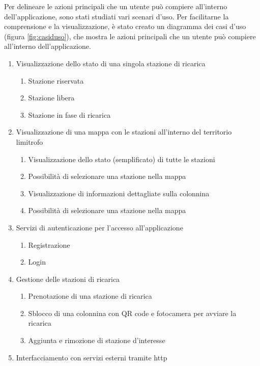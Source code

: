 Per delineare le azioni principali che un utente può compiere all'interno dell'applicazione, sono stati studiati vari scenari d'uso.
Per facilitarne la comprensione e la visualizzazione, è stato creato un diagramma dei casi d'uso (figura \ref{fig:casiduso}), che mostra le azioni principali che un utente può compiere all'interno dell'applicazione.
\begin{enumerate}[label=\arabic*.]
    \item Visualizzazione dello stato di una singola stazione di ricarica
          \begin{enumerate}[label=\arabic{enumi}.\arabic*]
              \item Stazione riservata
              \item Stazione libera
              \item Stazione in fase di ricarica
          \end{enumerate}
    \item Visualizzazione di una mappa con le stazioni all'interno del territorio limitrofo
          \begin{enumerate}[label=\arabic{enumi}.\arabic*]
              \item Visualizzazione dello stato (semplificato) di tutte le stazioni
              \item Possibilità di selezionare una stazione nella mappa
              \item Visualizzazione di informazioni dettagliate sulla colonnina
              \item Possibilità di selezionare una stazione nella mappa
          \end{enumerate}
    \item Servizi di autenticazione per l'accesso all'applicazione
          \begin{enumerate}[label=\arabic{enumi}.\arabic*]
              \item Registrazione
              \item Login
          \end{enumerate}
    \item Gestione delle stazioni di ricarica
          \begin{enumerate}[label=\arabic{enumi}.\arabic*]
              \item Prenotazione di una stazione di ricarica
              \item Sblocco di una colonnina con QR code e fotocamera per avviare la ricarica
              \item Aggiunta e rimozione di stazione d'interesse
          \end{enumerate}
    \item Interfacciamento con servizi esterni tramite http
\end{enumerate}

